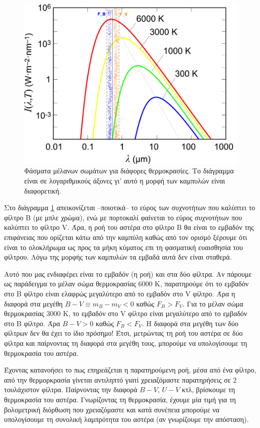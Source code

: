 \begin{figure}[h]
    \centering
    \includegraphics[scale=0.3]{Figures/Planck_law_log_log_scale.png}
    \caption{Φάσματα μέλανων σωμάτων για διάφορες θερμοκρασίες. Το διάγραμμα είναι σε λογαριθμικούς άξονες γι' αυτό η μορφή των καμπυλών είναι διαφορετική.}
    \label{fig:planck_law_log_scale}
\end{figure}

Στο διάγραμμα \ref{fig:planck_law_log_scale} απεικονίζεται --ποιοτικά-- το εύρος των συχνοτήτων που καλύπτει το φίλτρο B (με μπλε χρώμα), ενώ με πορτοκαλί φαίνεται το εύρος συχνοτήτων που καλύπτει το φίλτρο V. Άρα, η ροή του αστέρα στο φίλτρο B θα είναι το εμβαδόν της επιφάνειας που ορίζεται κάτω από την καμπύλη καθώς από τον ορισμό ξέρουμε ότι είναι το ολοκλήρωμα ως προς τα μήκη κύματος επι τη φασματική ευαισθησία του φίλτρου. Λόγω της μορφής των καμπυλών τα εμβαδά αυτά δεν είναι σταθερά.

Αυτό που μας ενδιαφέρει είναι το εμβαδόν (η ροή) και στα δύο φίλτρα. Αν πάρουμε ως παράδειγμα το μέλαν σώμα θερμοκρασίας 6000 Κ, παρατηρούμε ότι το εμβαδόν στο B φίλτρο είναι ελαφρώς μεγαλύτερο από το εμβαδόν στο V φίλτρο. Άρα η διαφορά στα μεγέθη $B - V \equiv m_B - m_V < 0$ καθώς $F_B > F_V$.
Για το μέλαν σώμα θερμοκρασίας 3000 Κ, το εμβαδόν στο V φίλτρο είναι μεγαλύτερο από το εμβαδόν στο B φίλτρο. Άρα $B - V > 0$ καθώς $F_B < F_V$.
Η διαφορά στα μεγέθη των δύο φίλτρων δεν θα έχει το ίδιο πρόσημο! Έτσι, μετρώντας τη ροή του αστέρα σε δύο φίλτρα και παίρνοντας τη διαφορά στα μεγέθη τους, μπορούμε να υπολογίσουμε τη θερμοκρασία του αστέρα.


Έχοντας κατανοήσει το πως επηρεάζεται η παρατηρούμενη ροή, μέσα από ένα φίλτρο, από την θερμορκρασία γίνεται αντιληπτό γιατί χρειαζόμαστε παρατηρήσεις σε 2 τουλάχιστον φίλτρα. Παίρνοντας την διαφορά $B - V$, $U - V$ κτλ, βρίσκουμε τη θερμοκρασία του αστέρα. Γνωρίζοντας τη θερμοκρασία, έχουμε μία τιμή για τη βολομετρική διόρθωση που χρειαζόμαστε και κατά συνέπεια μπορούμε να υπολογίσουμε τη συνολική λαμπρότητα του αστέρα (αν γνωρίζουμε την απόσταση).


